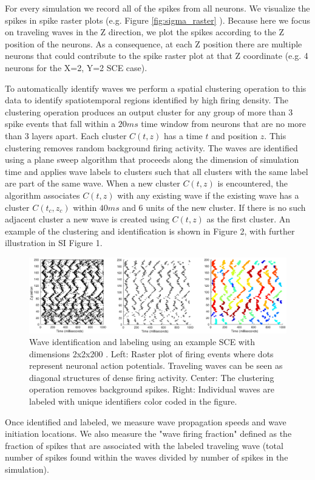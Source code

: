 \documentclass[12pt]{article}
\begin{document}
For every simulation we record all of the spikes from all neurons. 
We visualize the spikes in spike raster plots (e.g. Figure \ref{fig:sigma_raster} ).
Because here we focus on traveling waves in the Z direction, we plot the spikes according to the Z position of the neurons.
As a consequence, at each Z position there are multiple neurons that could contribute to the spike raster plot at that Z coordinate (e.g. 4 neurons for the X=2, Y=2 SCE case).

To automatically identify waves we perform a spatial clustering operation to this data to identify spatiotemporal regions identified by high firing density. 
The clustering operation produces an output cluster for any group of more than $3$ spike events that fall within a $20ms$ time window from neurons that are no more than $3$ layers apart.
Each cluster $C(t,z)$ has a time $t$ and position $z$.
This clustering removes random background firing activity. 
The waves are identified using a plane sweep algorithm that proceeds along the dimension of simulation time and applies wave labels to clusters such that all clusters with the same label are part of the same wave.
When a new cluster $C(t,z)$ is encountered, the algorithm associates $C(t,z)$ with any existing wave if the existing wave has a cluster $C(t_c,z_c)$ within $40 ms$ and $6$ units of the new cluster.
If there is no such adjacent cluster a new wave is created using $C(t,z)$ as the first cluster.
An example of the clustering and identification is shown in Figure 2, with further illustration in SI Figure 1.

\begin{figure}[!htb]
 \centering
 \includegraphics[width=\textwidth]{fig/DetectorExample}
 \caption{Wave identification and labeling using an example SCE with dimensions 2x2x200 . Left: Raster plot of firing events where dots represent neuronal action potentials. 
          Traveling waves can be seen as diagonal structures of dense firing activity. 
          Center: The clustering operation removes background spikes. 
          Right: Individual waves are labeled with unique identifiers color coded in the figure.}
 \label{fig:wave_analysis}
\end{figure}
\FloatBarrier
Once identified and labeled, we measure wave propagation speeds and wave initiation locations. 
We also measure the "wave firing fraction" defined as the fraction of spikes that are associated with the labeled traveling wave (total number of spikes found within the waves divided by number of spikes in the simulation). 
\end{document}
